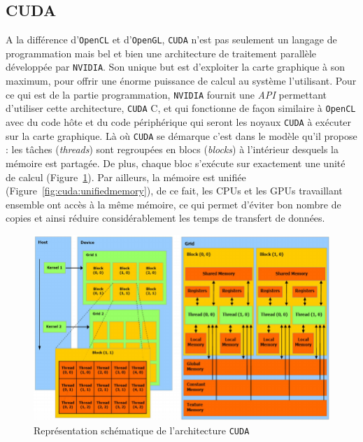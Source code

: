 \subsection{CUDA} 
A la différence d'\texttt{OpenCL} et d'\texttt{OpenGL}, \texttt{CUDA} n'est pas seulement un langage de programmation mais bel et bien une architecture de traitement parallèle développée par \texttt{NVIDIA}. Son unique but est d'exploiter la carte graphique à son maximum, pour offrir une énorme puissance de calcul au système l'utilisant. Pour ce qui est de la partie programmation, \texttt{NVIDIA} fournit une \emph{API} permettant d'utiliser cette architecture, \texttt{CUDA} C, et qui fonctionne de façon similaire à \texttt{OpenCL} avec du code hôte et du code périphérique qui seront les noyaux \texttt{CUDA} à exécuter sur la carte graphique. Là où \texttt{CUDA} se démarque c'est dans le modèle qu'il propose : les tâches (\emph{threads}) sont regroupées en blocs (\emph{blocks}) à l'intérieur desquels la mémoire est partagée. De plus, chaque bloc s'exécute sur exactement une unité de calcul (Figure~\ref{fig:cuda:archi}). Par ailleurs, la mémoire est unifiée (Figure~\ref{fig:cuda:unifiedmemory}), de ce fait, les CPUs et les GPUs travaillant ensemble ont accès à la même mémoire, ce qui permet d'éviter bon nombre de copies et ainsi réduire considérablement les temps de transfert de données.

\begin{figure}[H]
\centering
\includegraphics[width=0.9\linewidth]{images/cuda-archi}
\caption{Représentation schématique de l'architecture \texttt{CUDA}\protect\footnotemark}
\label{fig:cuda:archi}
\end{figure}


